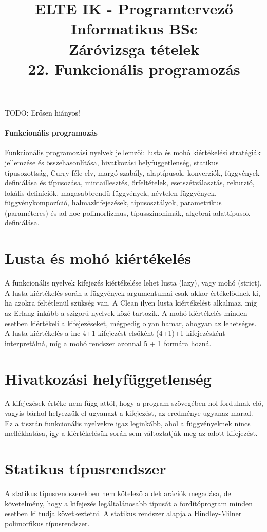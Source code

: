 \documentclass[margin=0px]{article}
\title{\textbf{{\Large ELTE IK - Programtervező Informatikus BSc} \vspace{0.2cm} \\ {\huge Záróvizsga tételek}} \vspace{0.3cm} \\ 22. Funkcionális programozás}
\author{}
\date{}
\newenvironment{tetel}[1]{\paragraph{#1 \\}}{}
\begin{document}
\maketitle

TODO: Erősen hiányos!

\begin{tetel}{Funkcionális programozás}
    Funkcionális programozási nyelvek jellemzői: lusta és mohó kiértékelési stratégiák jellemzése és összehasonlítása, hivatkozási helyfüggetlenség, statikus típusozottság, Curry-féle elv, margó szabály, alaptípusok, konverziók, függvények definiálása és típusozása, mintaillesztés, őrfeltételek, esetszétválasztás, rekurzió, lokális definíciók, magasabbrendű függvények, névtelen függvények, függvénykompozíció, halmazkifejezések, típusosztályok, parametrikus (paraméteres) és ad-hoc polimorfizmus, típusszinonimák, algebrai adattípusok definiálása.
\end{tetel}

\section{Lusta és mohó kiértékelés}
A funkcionális nyelvek kifejezés kiértékelése lehet lusta (lazy), vagy mohó (strict). A lusta kiértékelés során a függvények argumentumai csak akkor értékelődnek ki, ha azokra feltétlenül szükség van. A Clean ilyen lusta kiértékelést alkalmaz, míg az Erlang inkább a szigorú nyelvek közé tartozik. A mohó kiértékelés minden esetben kiértékeli a kifejezéseket, mégpedig olyan hamar, ahogyan az lehetséges. A lusta kiértékelés a inc 4+1 kifejezést elsőként (4+1)+1 kifejezésként interpretálná, míg a mohó rendszer azonnal 5 + 1 formára hozná.

\section{Hivatkozási helyfüggetlenség}
A kifejezések értéke nem függ attól, hogy a program szövegében hol fordulnak elő, vagyis bárhol helyezzük el ugyanazt a kifejezést, az eredménye ugyanaz marad. Ez a tisztán funkcionális nyelvekre igaz leginkább, ahol a függvényeknek nincs mellékhatása, így a kiértékelésük során sem változtatják meg az adott kifejezést.

\section{Statikus típusrendszer}
A statikus típusrendszerekben nem kötelező a deklarációk megadása, de követelmény, hogy a kifejezés legáltalánosabb típusát a fordítóprogram minden esetben ki tudja következtetni. A statikus rendszer alapja a Hindley-Milner polimorfikus típusrendszer.
\end{document}

